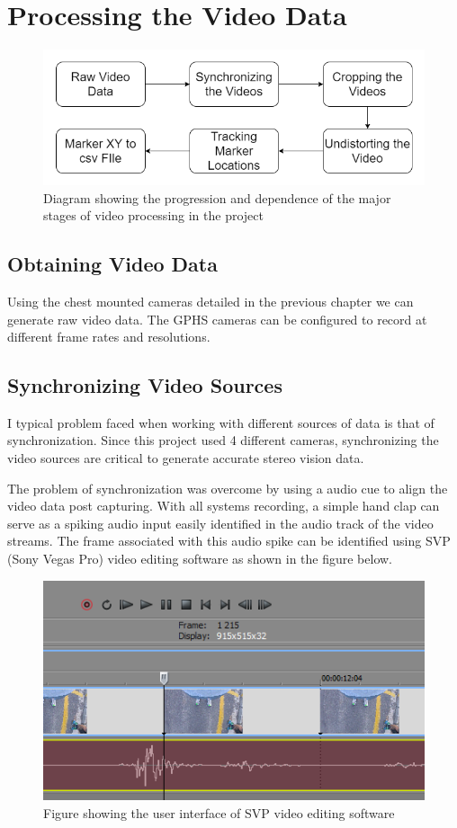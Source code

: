\section{Processing the Video Data}
\begin{figure}[!ht]
  \includegraphics[width=\linewidth]{figures/videoProcess.png}
  \caption{Diagram showing the progression and dependence of the major stages of video processing in the project}
  \label{fig:videoProcess}
\end{figure}

\subsection{Obtaining Video Data}
Using the chest mounted cameras detailed in the previous chapter we can generate raw video data. The GPHS cameras can be configured to record at different frame rates and resolutions.




\subsection{Synchronizing Video Sources}
I typical problem faced when working with different sources of data is that of synchronization. Since this project used 4 different cameras, synchronizing the video sources are critical to generate accurate stereo vision data.

The problem of synchronization was overcome by using a audio cue to align the video data post capturing. With all systems recording, a simple hand clap can serve as a spiking audio input easily identified in the audio track of the video streams. The frame associated with this audio spike can be identified using SVP (Sony Vegas Pro) video editing software as shown in the figure below. 

\begin{figure}[!ht]
\centering
  \includegraphics[width=0.5\linewidth]{figures/svpframe.png}
  \caption{Figure showing the user interface of SVP video editing software}
  \label{fig:svpframe}
\end{figure}

